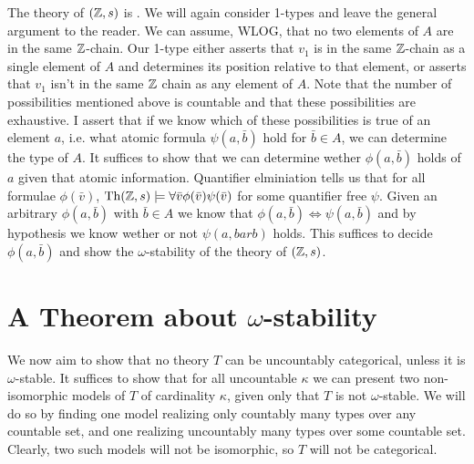 \begin{example}\label{example_omst_Z}
The theory of \((\mathbb{Z}, s)\) is \omst. 
We will again consider 1-types and leave the general argument to the reader. 
We can assume, WLOG, that no two elements of \(A\) are in the same \(\mathbb{Z}\)-chain. 
Our 1-type either asserts that \(v_1\) is in the same \(\mathbb{Z}\)-chain as a single element of \(A\) and determines its position relative to that element, or asserts that \(v_1\) isn't in the same \(\mathbb{Z}\) chain as any element of \(A\). 
Note that the number of possibilities mentioned above is countable and that these possibilities are exhaustive.
I assert that if we know which of these possibilities is true of an element \(a\), i.e. what atomic formula \(\psi(a, \bar{b})\) hold for \(\bar{b} \in A\), we can determine the type of \(A\). 
It suffices to show that we can determine wether \(\phi(a, \bar{b})\) holds of \(a\) given that atomic information.  
Quantifier elminiation tells us that for all formulae \(\phi(\bar{v})\), \(\text{Th}(\mathbb{Z}, s) \models \forall \bar{v} \phi(\bar{v}) \psi(\bar{v})\) for some quantifier free \(\psi\).
Given an arbitrary \(\phi(a, \bar{b})\) with \(\bar{b} \in A\) we know that \(\phi(a, \bar{b}) \iff  \psi(a, \bar{b})\) and by hypothesis we know wether or not \(\psi(a, bar{b})\) holds. 
This suffices to decide \(\phi(a, \bar{b})\) and show the \(\omega\)-stability of the theory of \((\mathbb{Z}, s)\).
\end{example}

\section{A Theorem about \(\omega\)-stability}
We now aim to show that no theory \(T\) can be uncountably categorical, unless it is \(\omega\)-stable.
It suffices to show that for all uncountable \(\kappa\) we can present two non-isomorphic models of \(T\) of cardinality \(\kappa\), given only that \(T\) is not \(\omega\)-stable.  
We will do so by finding one model realizing only countably many types over any countable set, and one realizing uncountably many types over some countable set. 
Clearly, two such models will not be isomorphic, so \(T\) will not be categorical. 


